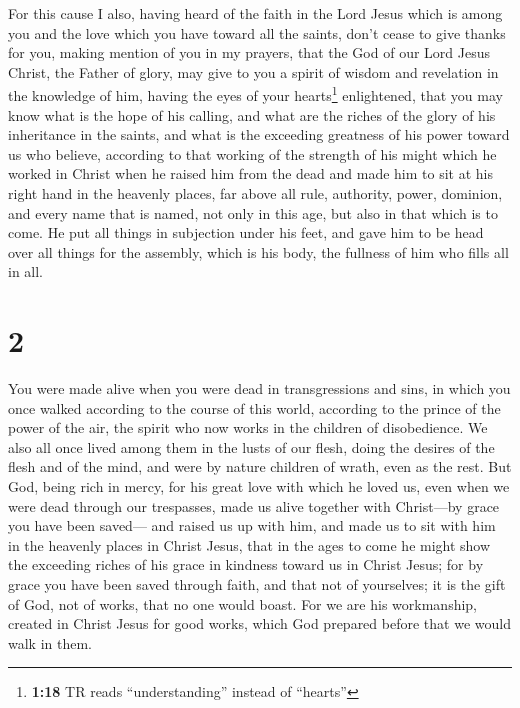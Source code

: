 For this cause I also, having heard of the faith in the
Lord Jesus which is among you and the love which you have toward all the
saints,  don't cease to give thanks for you, making
mention of you in my prayers,  that the God of our Lord
Jesus Christ, the Father of glory, may give to you a spirit of wisdom
and revelation in the knowledge of him,  having the eyes
of your hearts\footnote{\textbf{1:18} TR reads ``understanding'' instead
  of ``hearts''} enlightened, that you may know what is the hope of his
calling, and what are the riches of the glory of his inheritance in the
saints,  and what is the exceeding greatness of his power
toward us who believe, according to that working of the strength of his
might  which he worked in Christ when he raised him from
the dead and made him to sit at his right hand in the heavenly places,
 far above all rule, authority, power, dominion, and
every name that is named, not only in this age, but also in that which
is to come.  He put all things in subjection under his
feet, and gave him to be head over all things for the assembly,
 which is his body, the fullness of him who fills all in
all.

\hypertarget{section-1}{%
\section{2}\label{section-1}}

 You were made alive when you were dead in transgressions
and sins,  in which you once walked according to the
course of this world, according to the prince of the power of the air,
the spirit who now works in the children of disobedience. 
We also all once lived among them in the lusts of our flesh, doing the
desires of the flesh and of the mind, and were by nature children of
wrath, even as the rest.  But God, being rich in mercy,
for his great love with which he loved us,  even when we
were dead through our trespasses, made us alive together with
Christ---by grace you have been saved---  and raised us up
with him, and made us to sit with him in the heavenly places in Christ
Jesus,  that in the ages to come he might show the
exceeding riches of his grace in kindness toward us in Christ Jesus;
 for by grace you have been saved through faith, and that
not of yourselves; it is the gift of God,  not of works,
that no one would boast.  For we are his workmanship,
created in Christ Jesus for good works, which God prepared before that
we would walk in them.

